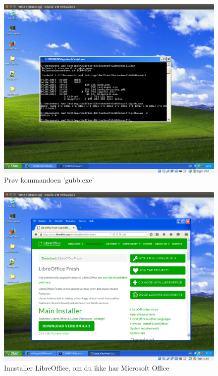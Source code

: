 \documentclass[12pt]{book}
\begin{document}
\begin{figure}[h]
\includegraphics[width=15cm]{009}
\caption{Prøv kommandoen 'gubb.exe'}
\end{figure}

\begin{figure}[h]
\includegraphics[width=15cm]{010}
\caption{Innstaller LibreOffice, om du ikke har Microsoft Office}
\end{figure}
\end{document}

